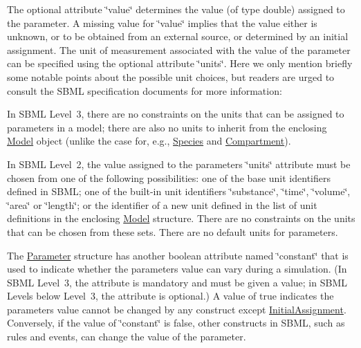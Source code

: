 The optional attribute \char`\"{}value\char`\"{} determines the value (of type {\ttfamily double}) assigned to the parameter. A missing value for \char`\"{}value\char`\"{} implies that the value either is unknown, or to be obtained from an external source, or determined by an initial assignment. The unit of measurement associated with the value of the parameter can be specified using the optional attribute \char`\"{}units\char`\"{}. Here we only mention briefly some notable points about the possible unit choices, but readers are urged to consult the S\+B\+ML specification documents for more information\+: 
\begin{DoxyItemize}
\item In S\+B\+ML Level~3, there are no constraints on the units that can be assigned to parameters in a model; there are also no units to inherit from the enclosing \hyperlink{class_model}{Model} object (unlike the case for, e.\+g., \hyperlink{class_species}{Species} and \hyperlink{class_compartment}{Compartment}).


\item In S\+B\+ML Level~2, the value assigned to the parameter\textquotesingle{}s \char`\"{}units\char`\"{} attribute must be chosen from one of the following possibilities\+: one of the base unit identifiers defined in S\+B\+ML; one of the built-\/in unit identifiers {\ttfamily \char`\"{}substance\char`\"{}}, {\ttfamily \char`\"{}time\char`\"{}}, {\ttfamily \char`\"{}volume\char`\"{}}, {\ttfamily \char`\"{}area\char`\"{}} or {\ttfamily \char`\"{}length\char`\"{}}; or the identifier of a new unit defined in the list of unit definitions in the enclosing \hyperlink{class_model}{Model} structure. There are no constraints on the units that can be chosen from these sets. There are no default units for parameters. 
\end{DoxyItemize}

The \hyperlink{class_parameter}{Parameter} structure has another boolean attribute named \char`\"{}constant\char`\"{} that is used to indicate whether the parameter\textquotesingle{}s value can vary during a simulation. (In S\+B\+ML Level~3, the attribute is mandatory and must be given a value; in S\+B\+ML Levels below Level~3, the attribute is optional.) A value of {\ttfamily true} indicates the parameter\textquotesingle{}s value cannot be changed by any construct except \hyperlink{class_initial_assignment}{Initial\+Assignment}. Conversely, if the value of \char`\"{}constant\char`\"{} is {\ttfamily false}, other constructs in S\+B\+ML, such as rules and events, can change the value of the parameter.

